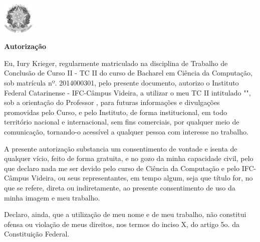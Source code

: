 \begin{folhadeautorizacao}

  \begin{center}
  \vspace*{1 cm}
  \vspace{-2cm}
   \centering\includegraphics[width=1.5cm]{images/brasaoRepublicaPeB.jpg}
   \vspace{-0.5 cm}
    {\large \SingleSpacing \imprimirinstituicao}
    \vspace{-0.5cm}
    \center{ \hrulefill}
    
     {\large \SingleSpacing \textbf{Autorização}}
    
    
    \vspace*{1 cm}
    
    \vspace*{0.5 cm}
    
   \end{center}
   


Eu, Iury Krieger, regularmente matriculado na disciplina de Trabalho de Conclusão de Curso II - TC II do curso de Bacharel em Ciência da Computação, sob matrícula nº. 2014000301, pelo presente documento, autorizo o Instituto Federal Catarinense - IFC-Câmpus Videira, a utilizar o meu TC II intitulado "\imprimirtitulo", sob a orientação do Professor \imprimirorientador, para futuras informações e divulgações promovidas pelo Curso, e pelo Instituto, de forma institucional, em todo território nacional e internacional, sem fins comerciais, por qualquer meio de comunicação, tornando-o acessível a qualquer pessoa com interesse no trabalho.

A presente autorização substancia um consentimento de vontade e isenta de qualquer vício, feito de forma gratuita, e no gozo da minha capacidade civil, pelo que declaro nada me ser devido pelo curso de Ciência da Computação e pelo IFC-Câmpus Videira, ou seus representantes, em tempo algum, seja que título for, no que se refere, direta ou indiretamente, ao presente consentimento de uso da minha imagem e meu trabalho.

Declaro, ainda, que a utilização de meu nome e de meu trabalho, não constitui ofensa ou violação de meus direitos, nos termos do inciso X, do artigo 5o. da Constituição Federal.


\end{folhadeautorizacao}
